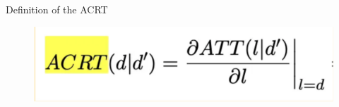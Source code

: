 \documentclass{beamer}
\begin{document}
\begin{frame}{Definition of the ACRT}

\begin{figure}
\begin{center}
             \includegraphics[scale=0.3]{./lecture_includes/continuous4.png}
\end{center}
\end{figure}

\end{frame}
\end{document}
